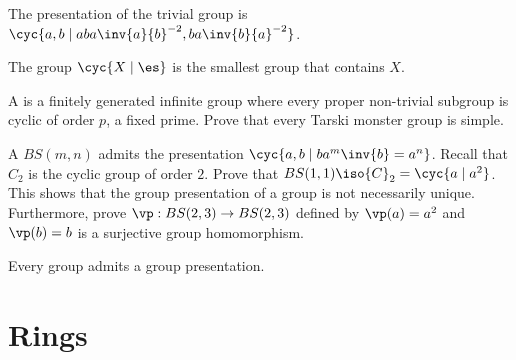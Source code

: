 \documentclass[10pt]{article}
\begin{document}
\begin{example}
    The presentation of the trivial group is $\cyc{a,b\mid aba\inv{a}{b}^{-2},ba\inv{b}{a}^{-2}}$.
\end{example}
\begin{proposition}
    The group $\cyc{X\mid\es}$ is the smallest group that contains $X$.
\end{proposition}
\begin{problem}
    A  is a finitely generated infinite group where every proper non-trivial subgroup is cyclic of order $p$, a fixed prime. Prove that every Tarski monster group is simple.
\end{problem}
\begin{problem}
    A  $BS(m,n)$ admits the presentation $\cyc{a,b\mid b{a}^{m}\inv{b}={a}^{n}}$. Recall that ${C}_{2}$ is the cyclic group of order $2$. Prove that $BS(1,1)\iso{C}_{2}=\cyc{a\mid{a}^{2}}$. This shows that the group presentation of a group is not necessarily unique. Furthermore, prove $\vp:BS(2,3)\to BS(2,3)$ defined by $\vp(a)={a}^{2}$ and $\vp(b)=b$ is a surjective group homomorphism.
\end{problem}
\par
Every group admits a group presentation.


\newpage
\section{Rings}



\newpage
\end{document}
